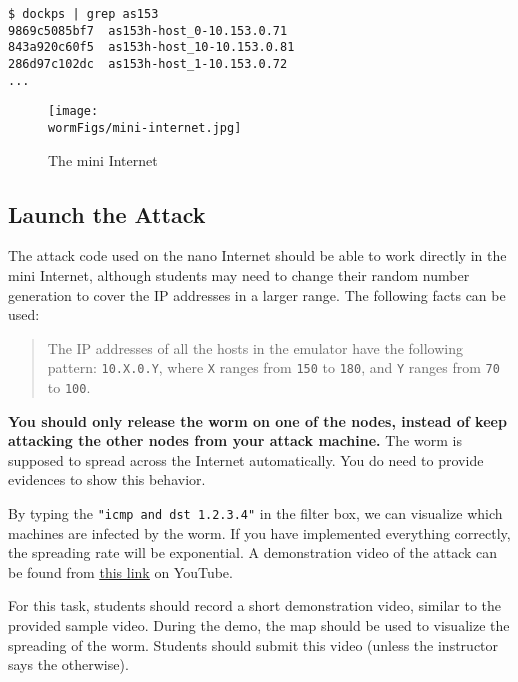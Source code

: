 \begin{lstlisting}
$ dockps | grep as153
9869c5085bf7  as153h-host_0-10.153.0.71
843a920c60f5  as153h-host_10-10.153.0.81
286d97c102dc  as153h-host_1-10.153.0.72
...
\end{lstlisting}
 


\begin{figure}[htb]
  \begin{center}
    \texttt{[image: \\wormFigs/mini-internet.jpg]}
  \end{center}
  \caption{The mini Internet}
  \label{fig:mini-internet}
\end{figure}
 




\subsection{Launch the Attack} 

The attack code used on the nano Internet should be able to 
work directly in the mini Internet, 
although students may need to change their random number
generation to cover the IP addresses in a larger range. 
The following facts can be used: 

\begin{quote}
    The IP addresses of all the hosts in the emulator have the following
    pattern: \texttt{10.X.0.Y}, where \texttt{X} ranges from 
    \texttt{150} to \texttt{180}, 
    and \texttt{Y} ranges from \texttt{70} to \texttt{100}.  
\end{quote}


\textbf{You should only release the worm on one of the nodes, instead of keep
attacking the other nodes from your attack machine.}
The worm is supposed to spread across the Internet automatically.
You do need to provide evidences to show this behavior.

By typing the \texttt{"icmp and dst 1.2.3.4"} in the filter box,
we can visualize which machines are infected by the worm. 
If you have implemented 
everything correctly, the spreading rate will be exponential. 
A demonstration video of the attack can be found from 
\href{https://youtu.be/2VZV-aFoVjk}{\underline{this link}} 
on YouTube.


For this task, students should record a short
demonstration video, similar to the provided 
sample video. During the demo, the 
map should be used to visualize the spreading
of the worm. Students should submit this 
video (unless the instructor says the otherwise). 




